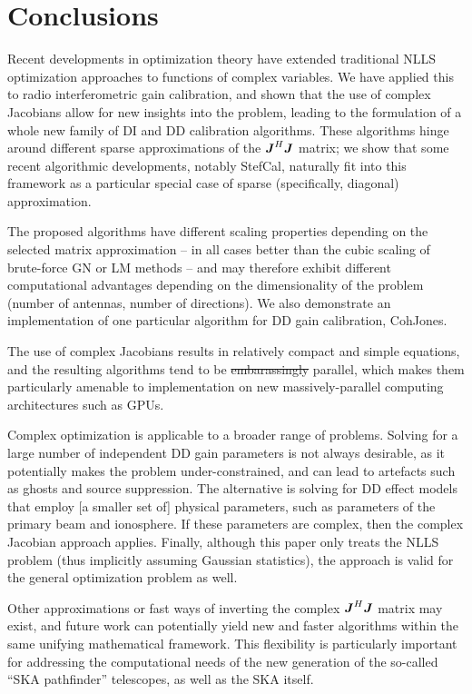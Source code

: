 \documentclass[useAMS,usenatbib]{mn2e}
\newcommand{\mat}[1]{{\bmath{#1}}}
\newcommand{\JJ}{\mat{J}} %
\newcommand{\JHJ}{\JJ^H\JJ} %
\newcommand{\COH}{{\sc CohJones}}
\newcommand{\StefCal}{{\sc StefCal}}
\numberwithin{equation}{section}
\providecommand{\DIFadd}[1]{{\protect\color{blue}\uwave{#1}}} %
\providecommand{\DIFdel}[1]{{\protect\color{red}\sout{#1}}}                      %
\providecommand{\DIFaddbegin}{} %
\providecommand{\DIFaddend}{} %
\providecommand{\DIFdelbegin}{} %
\providecommand{\DIFdelend}{} %
\begin{document}

\section*{Conclusions}

Recent developments in optimization theory have extended traditional NLLS optimization approaches
to functions of complex variables. We have applied this to radio interferometric gain calibration, 
and shown that the use of complex Jacobians allow for new insights into the problem, leading
to the formulation of a whole new family of DI and DD calibration algorithms. These algorithms hinge around
different sparse approximations of the $\JHJ$ matrix; we show that some recent algorithmic 
developments, notably \StefCal, naturally fit into this framework as a particular special case
of sparse (specifically, diagonal) approximation. 

The proposed algorithms have different scaling properties depending on the selected matrix approximation
-- in all cases better than the cubic scaling of brute-force GN or LM methods -- and may therefore exhibit 
different computational advantages depending on the dimensionality of the problem (number of antennas,
number of directions). We also demonstrate an implementation of one particular algorithm for DD gain
calibration, \COH.

The use of complex Jacobians results in relatively compact and simple equations, and the resulting algorithms
tend to be \DIFdelbegin \DIFdel{embarassingly }\DIFdelend \DIFaddbegin \DIFadd{embarrassingly }\DIFaddend parallel, which makes them particularly amenable to implementation on new
massively-parallel computing architectures such as GPUs. 

Complex optimization is applicable to a broader range of problems. Solving for a large number of independent DD gain
parameters is not always desirable, as it potentially makes the problem under-constrained, and can lead to artefacts 
such as ghosts and source suppression. The alternative is solving for DD effect models that employ [a smaller set of]
physical parameters, such as parameters of the primary beam and ionosphere. If these parameters are complex, then
the complex Jacobian approach applies. Finally, although this paper only treats the NLLS problem (thus implicitly
assuming Gaussian statistics), the approach is valid for the general optimization problem as well.

Other approximations or fast ways of inverting the complex $\JHJ$ matrix may exist, and future work can 
potentially yield new and faster algorithms within the same unifying mathematical framework. This flexibility 
is particularly important for addressing the computational needs of the new generation of the 
so-called ``SKA pathfinder'' telescopes, as well as the SKA itself.
\end{document}
